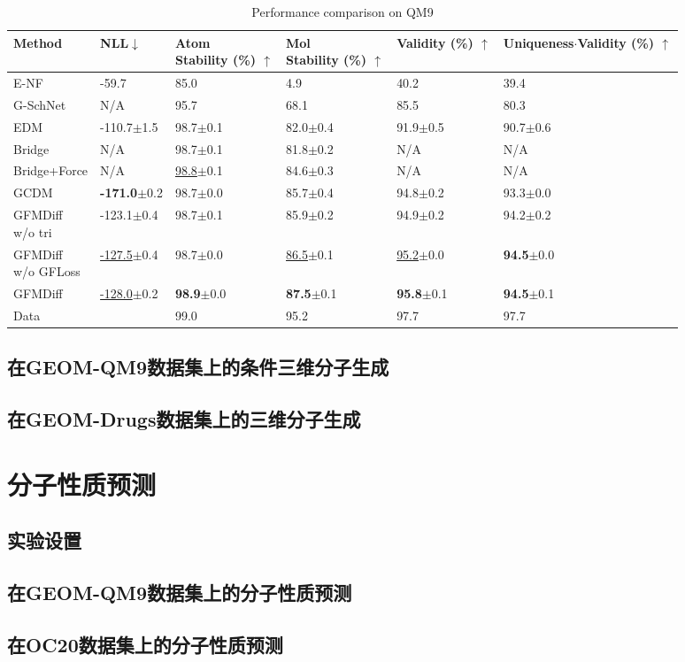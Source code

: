 \begin{table}[h]
    \centering
    \caption{Performance comparison on QM9}
    \label{tab:exp_qm9}
    \begin{tabular}{llllll}
    \hline
    Method & NLL$\downarrow$ & \makecell[l]{Atom\\Stability (\%)} $\uparrow$ & \makecell[l]{Mol\\Stability (\%)} $\uparrow$ & Validity (\%) $\uparrow$ & Uniqueness$\cdot$Validity (\%) $\uparrow$ \\
    \hline
    E-NF & -59.7 & 85.0 & 4.9 & 40.2 & 39.4 \\
    G-SchNet & N/A & 95.7 & 68.1 & 85.5 & 80.3 \\
    EDM & -110.7$\pm$1.5 & 98.7$\pm$0.1 & 82.0$\pm$0.4 & 91.9$\pm$0.5 & 90.7$\pm$0.6 \\
    Bridge & N/A & 98.7$\pm$0.1 & 81.8$\pm$0.2 & N/A & N/A \\
    Bridge+Force & N/A & \underline{98.8}$\pm$0.1 & 84.6$\pm$0.3 & N/A & N/A \\
    GCDM & \textbf{-171.0}$\pm$0.2 & 98.7$\pm$0.0 & 85.7$\pm$0.4 & 94.8$\pm$0.2 & 93.3$\pm$0.0 \\
    \hline
    \makecell[l]{GFMDiff\\w/o tri} & -123.1$\pm$0.4 & 98.7$\pm$0.1 & 85.9$\pm$0.2 & 94.9$\pm$0.2 & 94.2$\pm$0.2 \\
    \makecell[l]{GFMDiff\\w/o GFLoss} & \underline{-127.5}$\pm$0.4 & 98.7$\pm$0.0 & \underline{86.5}$\pm$0.1 & \underline{95.2}$\pm$0.0 & \textbf{94.5}$\pm$0.0 \\
    GFMDiff & \underline{-128.0}$\pm$0.2 & \textbf{98.9}$\pm$0.0 & \textbf{87.5}$\pm$0.1 & \textbf{95.8}$\pm$0.1 & \textbf{94.5}$\pm$0.1 \\
    \hline
    Data &  & 99.0 & 95.2 & 97.7 & 97.7 \\
    \hline
    \end{tabular}
\end{table}

\subsection{在GEOM-QM9数据集上的条件三维分子生成}

\subsection{在GEOM-Drugs数据集上的三维分子生成}

\section{分子性质预测}

\subsection{实验设置}

\subsection{在GEOM-QM9数据集上的分子性质预测}

\subsection{在OC20数据集上的分子性质预测}

